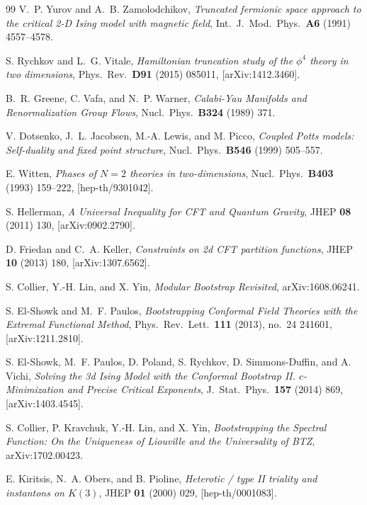 \begin{thebibliography}{99}
 V.~P. Yurov and A.~B. Zamolodchikov, \emph{Truncated fermionic space approach to the critical 2-D Ising model with magnetic field}, Int.\ J.\ Mod.\ Phys.\ \textbf{A6} (1991) 4557--4578.

 S. Rychkov and L.~G. Vitale, \emph{Hamiltonian truncation study of the $\phi^4$ theory in two dimensions}, Phys.\ Rev.\ \textbf{D91} (2015) 085011, [arXiv:1412.3460].

 B.~R. Greene, C. Vafa, and N.~P. Warner, \emph{Calabi-Yau Manifolds and Renormalization Group Flows}, Nucl.\ Phys.\ \textbf{B324} (1989) 371.

 V. Dotsenko, J.~L. Jacobsen, M.-A. Lewis, and M. Picco, \emph{Coupled Potts models: Self-duality and fixed point structure}, Nucl.\ Phys.\ \textbf{B546} (1999) 505--557.

 E. Witten, \emph{Phases of $N=2$ theories in two-dimensions}, Nucl.\ Phys.\ \textbf{B403} (1993) 159--222, [hep-th/9301042].

 S. Hellerman, \emph{A Universal Inequality for CFT and Quantum Gravity}, JHEP \textbf{08} (2011) 130, [arXiv:0902.2790].

 D. Friedan and C.~A. Keller, \emph{Constraints on 2d CFT partition functions}, JHEP \textbf{10} (2013) 180, [arXiv:1307.6562].

 S. Collier, Y.-H. Lin, and X. Yin, \emph{Modular Bootstrap Revisited}, arXiv:1608.06241.

 S. El-Showk and M.~F. Paulos, \emph{Bootstrapping Conformal Field Theories with the Extremal Functional Method}, Phys.\ Rev.\ Lett.\ \textbf{111} (2013), no.~24 241601, [arXiv:1211.2810].

 S. El-Showk, M.~F. Paulos, D. Poland, S. Rychkov, D. Simmons-Duffin, and A. Vichi, \emph{Solving the 3d Ising Model with the Conformal Bootstrap II. $c$-Minimization and Precise Critical Exponents}, J.\ Stat.\ Phys.\ \textbf{157} (2014) 869, [arXiv:1403.4545].

 S. Collier, P. Kravchuk, Y.-H. Lin, and X. Yin, \emph{Bootstrapping the Spectral Function: On the Uniqueness of Liouville and the Universality of BTZ}, arXiv:1702.00423.

 E. Kiritsis, N.~A. Obers, and B. Pioline, \emph{Heterotic / type II triality and instantons on $K(3)$}, JHEP \textbf{01} (2000) 029, [hep-th/0001083].


\end{thebibliography}
